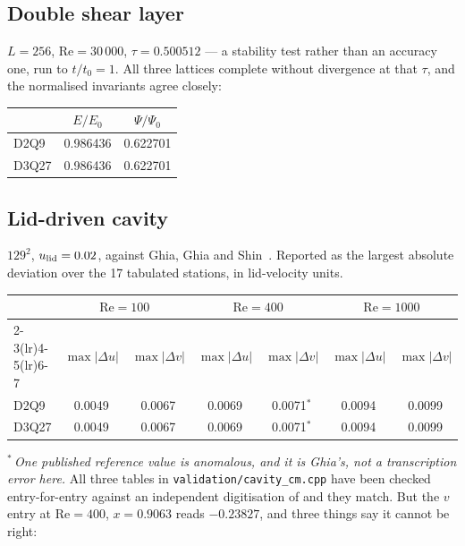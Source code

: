 \documentclass[11pt,a4paper]{article}
\newcommand{\code}[1]{\texttt{\small #1}}
\begin{document}
\subsection{Double shear layer}

$L=256$, $\mathrm{Re}=30\,000$, $\tau=0.500512$ --- a stability test rather than
an accuracy one, run to $t/t_0=1$. All three lattices complete without
divergence at that $\tau$, and the normalised invariants agree closely:

\begin{center}\small
\begin{tabular}{lcc}
\toprule
 & $E/E_0$ & $\Psi/\Psi_0$ \\
\midrule
D2Q9  & 0.986436 & 0.622701 \\
D3Q27 & 0.986436 & 0.622701 \\
\bottomrule
\end{tabular}
\end{center}

\subsection{Lid-driven cavity}

$129^2$, $u_{\rm lid}=0.02$, against Ghia, Ghia and Shin~\cite{ghia1982}.
Reported as the largest absolute deviation over the 17 tabulated stations, in
lid-velocity units.

\begin{center}\small
\begin{tabular}{lcccccc}
\toprule
 & \multicolumn{2}{c}{$\mathrm{Re}=100$} & \multicolumn{2}{c}{$\mathrm{Re}=400$}
 & \multicolumn{2}{c}{$\mathrm{Re}=1000$} \\
\cmidrule(lr){2-3}\cmidrule(lr){4-5}\cmidrule(lr){6-7}
 & $\max|\Delta u|$ & $\max|\Delta v|$ & $\max|\Delta u|$ & $\max|\Delta v|$
 & $\max|\Delta u|$ & $\max|\Delta v|$ \\
\midrule
D2Q9  & 0.0049 & 0.0067 & 0.0069 & 0.0071$^\ast$ & 0.0094 & 0.0099 \\
D3Q27 & 0.0049 & 0.0067 & 0.0069 & 0.0071$^\ast$ & 0.0094 & 0.0099 \\
\bottomrule
\end{tabular}
\end{center}

\noindent $^\ast$\,\emph{One published reference value is anomalous, and it is
Ghia's, not a transcription error here.} All three tables in
\code{validation/cavity\_cm.cpp} have been checked entry-for-entry against an
independent digitisation of \cite{ghia1982} and they match. But the $v$ entry at
$\mathrm{Re}=400$, $x = 0.9063$ reads $-0.23827$, and three things say it cannot
be right:
\end{document}
